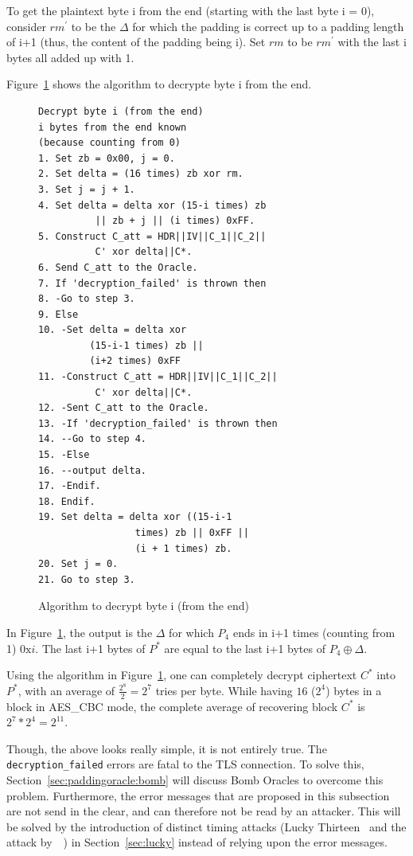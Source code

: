 \documentclass[10pt,conference,a4paper]{IEEEtran}
\begin{document}
To get the plaintext byte i from the end (starting with the last byte i = 0), consider $rm^{'}$ to be the $\Delta$ for which the padding is correct up to a padding length of i+1 (thus, the content of the padding being i). Set $rm$ to be $rm^{'}$ with the last i bytes all added up with 1.

Figure~\ref{sec:paddingoracle:padding:bytei} shows the algorithm to decrypte byte i from the end.

\begin{figure}
\begin{verbatim}
Decrypt byte i (from the end)
i bytes from the end known
(because counting from 0)
1. Set zb = 0x00, j = 0.
2. Set delta = (16 times) zb xor rm.
3. Set j = j + 1.
4. Set delta = delta xor (15-i times) zb 
          || zb + j || (i times) 0xFF.
5. Construct C_att = HDR||IV||C_1||C_2||
          C' xor delta||C*.
6. Send C_att to the Oracle.
7. If 'decryption_failed' is thrown then
8. -Go to step 3.
9. Else
10. -Set delta = delta xor 
         (15-i-1 times) zb || 
         (i+2 times) 0xFF
11. -Construct C_att = HDR||IV||C_1||C_2||
          C' xor delta||C*.
12. -Sent C_att to the Oracle.
13. -If 'decryption_failed' is thrown then
14. --Go to step 4.
15. -Else
16. --output delta.
17. -Endif.
18. Endif.
19. Set delta = delta xor ((15-i-1 
                 times) zb || 0xFF || 
                 (i + 1 times) zb.
20. Set j = 0.
21. Go to step 3.
\end{verbatim}
\caption{Algorithm to decrypt byte i (from the end)}
\label{sec:paddingoracle:padding:bytei}
\end{figure}

In Figure~\ref{sec:paddingoracle:padding:bytei}, the output is the $\Delta$ for which $P_4$ ends in i+1 times (counting from 1) $0\text{x}i$. The last i+1 bytes of $P^{*}$ are equal to the last i+1 bytes of $P_4 \oplus \Delta$.

Using the algorithm in Figure~\ref{sec:paddingoracle:padding:bytei}, one can completely decrypt ciphertext $C^{*}$ into $P^{*}$, with an average of $\frac{2^8}{2} = 2^7$ tries per byte. While having $16$ ($2^4$) bytes in a block in AES\_CBC mode, the complete average of recovering block $C^{*}$ is $2^7 * 2^4 = 2^{11}$.

Though, the above looks really simple, it is not entirely true. The \texttt{decryption\_failed} errors are fatal to the TLS connection. To solve this, Section~\ref{sec:paddingoracle:bomb} will discuss Bomb Oracles to overcome this problem. Furthermore, the error messages that are proposed in this subsection are not send in the clear, and can therefore not be read by an attacker. This will be solved by the introduction of distinct timing attacks (Lucky Thirteen~\cite{alfardan2013lucky} and the attack by~\citeauthor{canvel2003password}~\cite{canvel2003password}) in Section~\ref{sec:lucky} instead of relying upon the error messages.
\end{document}
